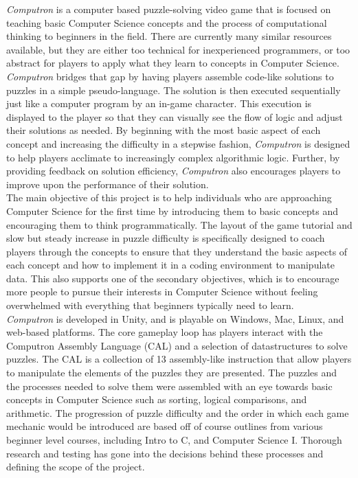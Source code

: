 \textit{Computron} is a computer based puzzle-solving video game that is focused
on teaching basic Computer Science concepts and the process of computational
thinking to beginners in the field. There are currently many similar resources
available, but they are either too technical for inexperienced programmers, or
 too abstract for players to apply what they learn to concepts in Computer
Science. \textit{Computron} bridges that gap by having players assemble code-like
solutions to puzzles in a simple pseudo-language. The solution is then executed
sequentially just like a computer program by an in-game character. This
execution is displayed to the player so that they can visually see the flow of
logic and adjust their solutions as needed. By beginning with the most basic
aspect of each concept and increasing the difficulty in a stepwise fashion,
\textit{Computron} is designed to help players acclimate to increasingly complex
algorithmic logic. Further, by providing feedback on solution efficiency,
\textit{Computron} also encourages players to improve upon the performance of
their solution.\\

The main objective of this project is to help individuals who are approaching
Computer Science for the first time by introducing them to basic concepts and
encouraging them to think programmatically. The layout of the game tutorial
and slow but steady increase in puzzle difficulty is specifically designed to coach
players through the concepts to ensure that they understand the basic aspects
of each concept and how to implement it in a coding environment to manipulate
data. This also supports one of the secondary objectives, which is to encourage
more people to pursue their interests in Computer Science without feeling
overwhelmed with everything that beginners typically need to learn.\\

\textit{Computron} is developed in Unity, and is playable on Windows, Mac, Linux, 
and web-based platforms. The core gameplay loop has players interact with the 
Computron Assembly Language (CAL) and a selection of datastructures to solve puzzles.
The CAL is a collection of 13 assembly-like instruction that allow players to manipulate
the elements of the puzzles they are presented. The puzzles and the 
processes needed to solve them were assembled with an eye towards basic concepts in Computer 
Science such as sorting, logical comparisons, and arithmetic. The progression of puzzle difficulty 
and the order in which each game mechanic would be introduced are based off of course outlines from
various beginner level courses, including Intro to C, and Computer Science I. Thorough research and testing has 
gone into the decisions behind these processes and defining the scope of the project.\\